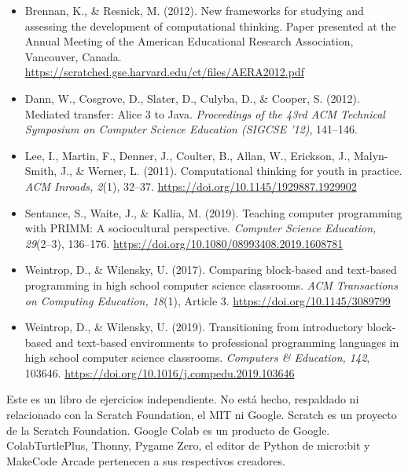 {\footnotesize
\begin{itemize}[leftmargin=*, itemsep=1pt]
  \item Brennan, K., \& Resnick, M. (2012). New frameworks for studying and assessing the development of computational thinking. Paper presented at the Annual Meeting of the American Educational Research Association, Vancouver, Canada. \url{https://scratched.gse.harvard.edu/ct/files/AERA2012.pdf}
  \item Dann, W., Cosgrove, D., Slater, D., Culyba, D., \& Cooper, S. (2012). Mediated transfer: Alice 3 to Java. \emph{Proceedings of the 43rd ACM Technical Symposium on Computer Science Education (SIGCSE '12)}, 141--146.
  \item Lee, I., Martin, F., Denner, J., Coulter, B., Allan, W., Erickson, J., Malyn-Smith, J., \& Werner, L. (2011). Computational thinking for youth in practice. \emph{ACM Inroads, 2}(1), 32--37. \url{https://doi.org/10.1145/1929887.1929902}
  \item Sentance, S., Waite, J., \& Kallia, M. (2019). Teaching computer programming with PRIMM: A sociocultural perspective. \emph{Computer Science Education, 29}(2--3), 136--176. \url{https://doi.org/10.1080/08993408.2019.1608781}
  \item Weintrop, D., \& Wilensky, U. (2017). Comparing block-based and text-based programming in high school computer science classrooms. \emph{ACM Transactions on Computing Education, 18}(1), Article 3. \url{https://doi.org/10.1145/3089799}
  \item Weintrop, D., \& Wilensky, U. (2019). Transitioning from introductory block-based and text-based environments to professional programming languages in high school computer science classrooms. \emph{Computers \& Education, 142}, 103646. \url{https://doi.org/10.1016/j.compedu.2019.103646}
\end{itemize}
}

\vspace{10pt}
\begin{tcolorbox}[colback=white, colframe=muted!50, boxrule=0.5pt, arc=5pt]
{\small\color{muted}Este es un libro de ejercicios independiente. No está hecho, respaldado ni relacionado con la Scratch Foundation, el MIT ni Google. Scratch es un proyecto de la Scratch Foundation. Google Colab es un producto de Google. ColabTurtlePlus, Thonny, Pygame Zero, el editor de Python de micro:bit y MakeCode Arcade pertenecen a sus respectivos creadores.}
\end{tcolorbox}
